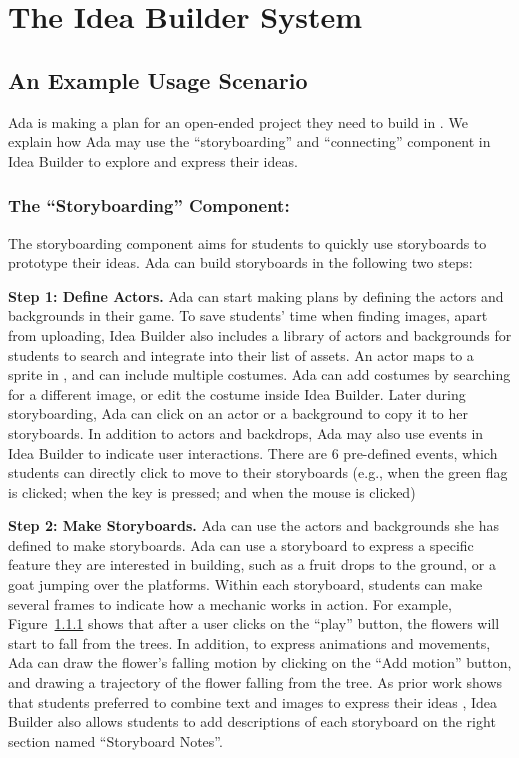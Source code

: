  


\section{The Idea Builder System}
\subsection{An Example Usage Scenario}

Ada is making a plan for an open-ended project they need to build in \snap. We explain how Ada may use the ``storyboarding'' and ``connecting'' component in Idea Builder to explore and express their ideas.

\subsubsection{The ``Storyboarding'' Component: } The storyboarding component aims for students to quickly use storyboards to prototype their ideas. Ada can build storyboards in the following two steps: 

\textbf{Step 1: Define Actors.} Ada can start making plans by defining the actors and backgrounds in their game. 
To save students' time when finding images, apart from uploading, Idea Builder also includes a library of actors and backgrounds for students to search and integrate into their list of assets. 
An actor maps to a sprite in \snap, and can include multiple costumes. Ada can add costumes by searching for a different image, or edit the costume inside Idea Builder. 
Later during storyboarding, Ada can click on an actor or a background to copy it to her storyboards. 
In addition to actors and backdrops, Ada may also use events in Idea Builder to indicate user interactions. There are 6 pre-defined events, which students can directly click to move to their storyboards (e.g., when the green flag is clicked; when the key is pressed;  and when the mouse is clicked)


\textbf{Step 2: Make Storyboards.}
Ada can use the actors and backgrounds she has defined to make storyboards. Ada can use a storyboard to express a specific feature they are interested in building, such as a fruit drops to the ground, or a goat jumping over the platforms. 
Within each storyboard, students can make several frames to indicate how a mechanic works in action. For example, Figure~\ref{} shows that after a user clicks on the ``play'' button, the flowers will start to fall from the trees. 
In addition, to express animations and movements, Ada can draw the flower's falling motion by clicking on the ``Add motion'' button, and drawing a trajectory of the flower falling from the tree. 
As prior work shows that students preferred to combine text and images to express their ideas \cite{limke2022case}, Idea Builder also allows students to add descriptions of each storyboard on the right section named ``Storyboard Notes''.


